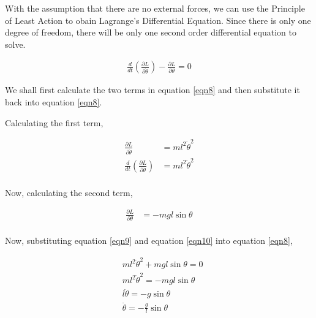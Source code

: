 \documentclass[12pt]{article}
\begin{document}
With the assumption that there are no external forces, we can use the Principle of Least Action to
obain Lagrange's Differential Equation. Since there is only one degree of freedom, there will be only
one second order differential equation to solve.

\begin{equation} \label{eqn8}
    \begin{split}
        \frac{d}{dt} \left( \frac{\partial{L}}{\partial{\dot{\theta}}} \right) - \frac{\partial{L}}{\partial{\theta}} = 0                   
    \end{split}
\end{equation}

We shall first calculate the two terms in equation \ref{eqn8} and then substitute it back into equation \ref{eqn8}.

\newpage

Calculating the first term,

\begin{equation} \label{eqn9}
    \begin{split}
        \frac{\partial{L}}{\partial{\dot{\theta}}} &= m l^{2} \dot{\theta}^{2} \\
        \frac{d}{dt} \left( \frac{\partial{L}}{\partial{\dot{\theta}}} \right) &= m l^{2} \ddot{\theta}^{2} \\
    \end{split}
\end{equation}

Now, calculating the second term,

\begin{equation} \label{eqn10}
    \begin{split}
        \frac{\partial{L}}{\partial{\theta}} &= -mgl\sin{\theta} \\
    \end{split}
\end{equation}

Now, substituting equation \ref{eqn9} and equation \ref{eqn10} into equation \ref{eqn8},

\begin{equation} \label{eqn11}
    \begin{split}
        & m l^{2} \ddot{\theta}^{2} + mgl\sin{\theta} = 0 \\
        & m l^{2} \ddot{\theta}^{2} = - mgl\sin{\theta} \\
        & l \ddot{\theta} = - g \sin{\theta} \\
        & \ddot{\theta} = - \frac{g}{l} \sin{\theta} \\
    \end{split}
\end{equation}
\end{document}
